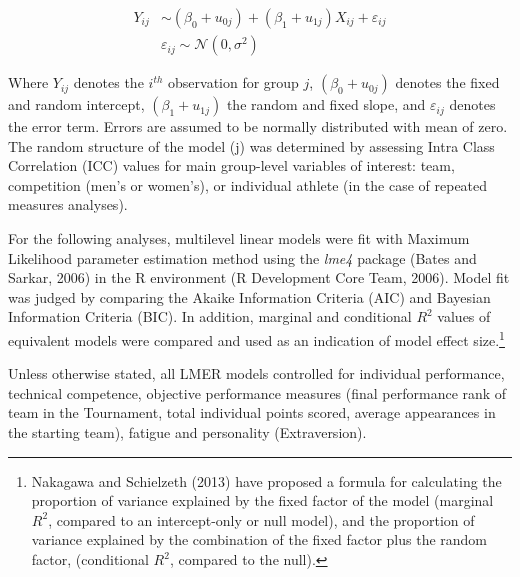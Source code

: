 \begin{CJK}{UTF8}{gbsn}
    \begin{align}
      Y_{ij} & \sim  (\beta_{0} + u_{0j}) + (\beta_{1} + u_{1j})X_{ij} + \varepsilon_{ij}\\
           & \varepsilon_{ij} \sim \mathcal{N}(0,\sigma^{2})
    \end{align}

Where $Y_{ij}$ denotes the $i^{th}$ observation for group $j$, $(\beta_{0} + u_{0j})$ denotes the fixed and random intercept, $(\beta_{1} + u_{1j})$ the random and fixed slope, and $\varepsilon_{ij}$ denotes the error term.  Errors are assumed to be normally distributed with mean of zero.
The random structure of the model (j) was determined by assessing Intra Class Correlation (ICC) values for main group-level variables of interest: team, competition (men's or women's), or individual athlete (in the case of repeated measures analyses).

For the following analyses, multilevel linear models were fit with Maximum Likelihood parameter estimation method using the \textit{lme4} package (Bates and Sarkar, 2006) in the R environment (R Development Core Team, 2006). Model fit was judged by comparing the Akaike Information Criteria (AIC) and Bayesian Information Criteria (BIC).  In addition, marginal and conditional $R^2$ values of equivalent models were compared and used as an indication of model effect size.\footnote{Nakagawa and Schielzeth (2013) have proposed a formula for calculating the proportion of variance explained by the fixed factor of the model (marginal $R^2$, compared to an intercept-only or null model), and the proportion of variance explained by the combination of the fixed factor plus the random factor, (conditional $R^2$, compared to the null).}


Unless otherwise stated, all LMER models controlled for individual performance, technical competence, objective performance measures (final performance rank of team in the Tournament, total individual points scored, average appearances in the starting team), fatigue and personality (Extraversion).



\end{CJK}
